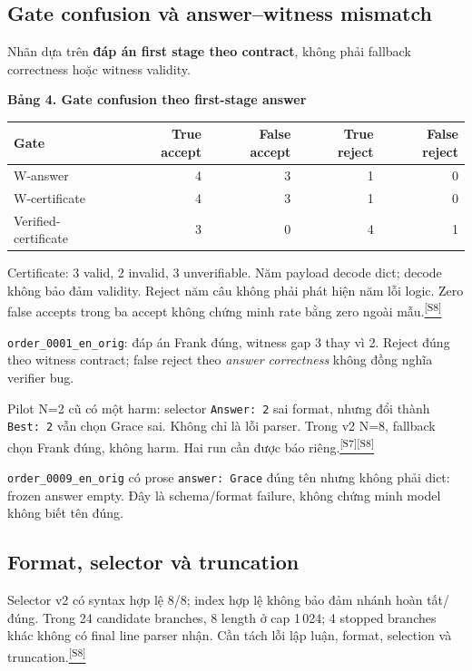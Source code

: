\documentclass[11pt,a4paper]{article}
\newenvironment{researchnote}[1]
  {\par\addvspace{7pt}\Needspace{4\baselineskip}\begingroup\small
   \noindent{\sffamily\bfseries #1}\par\nobreak\noindent}
  {\par\endgroup\addvspace{5pt}}
\newenvironment{examplebox}[1]{\begin{researchnote}{#1}}{\end{researchnote}}
\newcommand{\src}[1]{\hyperlink{src-#1}{\textcolor{muted}{\textsuperscript{[S#1]}}}}
\newcommand{\tabletitle}[1]{\par\addvspace{5pt}\Needspace{6\baselineskip}
  {\sffamily\small\bfseries #1}\par\nobreak}
\begin{document}
\subsection{Gate confusion và answer--witness mismatch}
Nhãn dựa trên \textbf{đáp án first stage theo contract}, không phải fallback correctness hoặc witness validity.
\tabletitle{Bảng 4. Gate confusion theo first-stage answer}
\begin{center}\small
\begin{tabularx}{\textwidth}{@{}Yrrrr@{}}
\toprule
\textbf{Gate} & \textbf{True accept} & \textbf{False accept} & \textbf{True reject} & \textbf{False reject}\\
\midrule
W-answer & 4 & 3 & 1 & 0\\
W-certificate & 4 & 3 & 1 & 0\\
Verified-certificate & 3 & 0 & 4 & 1\\
\bottomrule
\end{tabularx}
\end{center}
Certificate: 3 valid, 2 invalid, 3 unverifiable. Năm payload decode dict; decode không bảo đảm validity. Reject năm câu không phải phát hiện năm lỗi logic. Zero false accepts trong ba accept không chứng minh rate bằng zero ngoài mẫu.\src{8}

\begin{examplebox}{Frank: đáp án đúng, witness sai}
\texttt{order\_0001\_en\_orig}: đáp án Frank đúng, witness gap 3 thay vì 2. Reject đúng theo witness contract; false reject theo \emph{answer correctness} không đồng nghĩa verifier bug.

Pilot N=2 cũ có một harm: selector \texttt{Answer: 2} sai format, nhưng đổi thành \texttt{Best: 2} vẫn chọn Grace sai. Không chỉ là lỗi parser. Trong v2 N=8, fallback chọn Frank đúng, không harm. Hai run cần được báo riêng.\src{7}\src{8}
\end{examplebox}

\texttt{order\_0009\_en\_orig} có prose \texttt{answer: Grace} đúng tên nhưng không phải dict: frozen answer empty. Đây là schema/format failure, không chứng minh model không biết tên đúng.

\subsection{Format, selector và truncation}
Selector v2 có syntax hợp lệ 8/8; index hợp lệ không bảo đảm nhánh hoàn tất/đúng. Trong 24 candidate branches, 8 length ở cap 1\,024; 4 stopped branches khác không có final line parser nhận. Cần tách lỗi lập luận, format, selection và truncation.\src{8}
\end{document}
